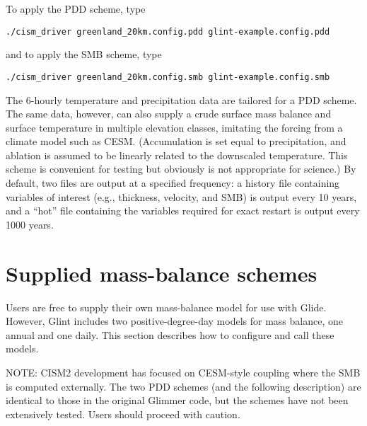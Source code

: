 To apply the PDD scheme, type
\begin{verbatim}
./cism_driver greenland_20km.config.pdd glint-example.config.pdd
\end{verbatim}
%
and to apply the SMB scheme, type
\begin{verbatim}
./cism_driver greenland_20km.config.smb glint-example.config.smb
\end{verbatim}
%
The 6-hourly temperature and precipitation data 
are tailored for a PDD scheme.  The same data, however, can also supply a crude
surface mass balance and surface temperature in multiple elevation classes, imitating
the forcing from a climate model such as CESM.  (Accumulation is set equal to precipitation,
and ablation is assumed to be linearly related to the downscaled temperature.
This scheme is convenient for testing but obviously is not appropriate for science.)
By default, two files are output at a specified frequency: a history file
containing variables of interest (e.g., thickness, velocity, and SMB) is output every 10 years,
and a ``hot'' file containing the variables required for exact restart is output every 1000 years.
 
%


\section{Supplied mass-balance schemes}


Users are free to supply their own mass-balance model for use
with Glide. However, Glint includes two positive-degree-day models
for mass balance, one annual and one daily.
This section describes how to configure and call these models.

NOTE: CISM2 development has focused on CESM-style coupling where the SMB
is computed externally.  The two PDD schemes (and the following description)
are identical to those in the original Glimmer code, but the schemes 
have not been extensively tested. Users should proceed with caution.

